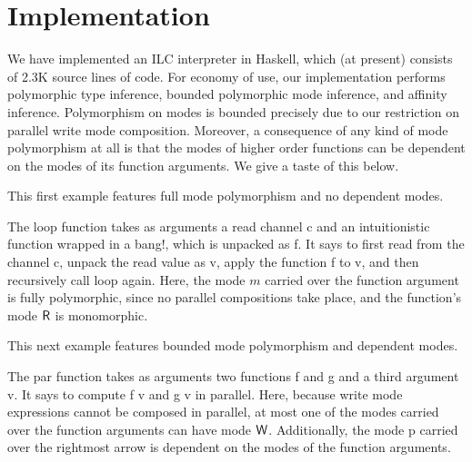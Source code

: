 \section{Implementation}
\label{sec:implementation}

We have implemented an ILC interpreter in Haskell, which (at present) consists
of 2.3K source lines of code.  For economy of use, our implementation performs
polymorphic type inference, bounded polymorphic mode inference, and affinity
inference. Polymorphism on modes is bounded precisely due to our restriction on
parallel write mode composition. Moreover, a consequence of any kind of mode
polymorphism at all is that the modes of higher order functions can be dependent
on the modes of its function arguments. We give a taste of this below.

This first example features full mode polymorphism and no dependent modes.

The \textsf{loop} function
takes as arguments a read channel \textsf{c} and an intuitionistic function
wrapped in a bang!, which is unpacked as \textsf{f}.  It says to first read from
the channel \textsf{c}, unpack the read value as \textsf{v}, apply the function
\textsf{f} to \textsf{v}, and then recursively call \textsf{loop} again. Here,
the mode $m$ carried over the function argument is fully polymorphic, since no
parallel compositions take place, and the function's mode $\textsf{R}$ is monomorphic.

This next example features bounded mode polymorphism and dependent modes.

The \textsf{par} function takes as arguments two functions \textsf{f} and
\textsf{g} and a third argument \textsf{v}. It says to compute \textsf{f v} and
\textsf{g v} in parallel. Here, because write mode expressions cannot be
composed in parallel, at most one of the modes carried over the function
arguments can have mode $\textsf{W}$. Additionally, the mode \textsf{p} carried over
the rightmost arrow is dependent on the modes of the function arguments.
